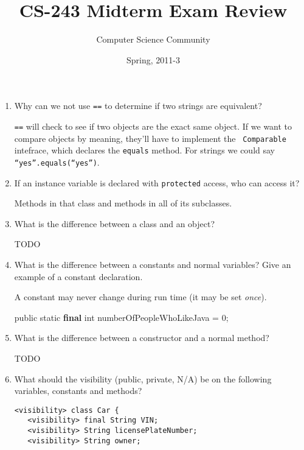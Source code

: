 \documentclass[11pt]{article}
\author{Computer Science Community}
\title{CS-243 Midterm Exam Review}
\date{Spring, 2011-3}
\makeatletter
\newenvironment{answer}{\large\lstset{basicstyle=\large}\color{white}}{}
\newenvironment{answer}{\large\lstset{basicstyle=\large}\color{red}}{}
\let\thetitle\@title
\let\thedate\@date
\makeatother
\begin{document}
\noindent{\Large \thetitle \hfill \thedate}

\begin{enumerate}

\item Why can we not use {\tt ==} to determine if two strings are equivalent?

    \begin{answer}
    {\tt ==} will check to see if two objects are the exact same object. If we
    want to compare objects by meaning, they'll have to implement the {\tt
    Comparable} intefrace, which declares the {\tt equals} method. For strings
    we could say {\tt ``yes''.equals(``yes'')}.
    \end{answer}

\item If an instance variable is declared with {\tt protected} access, who can
      access it?

    \begin{answer}
    Methods in that class and methods in all of its subclasses.
    \end{answer}

\item What is the difference between a class and an object?

    \begin{answer}
    \huge TODO
    \end{answer}

\item What is the difference between a constants and normal variables? Give an
      example of a constant declaration.

    \begin{answer}
    A constant may never change during run time (it may be set {\em once}).

    public static {\bf final} int numberOfPeopleWhoLikeJava = 0;
    \end{answer}

\item What is the difference between a constructor and a normal method?

    \begin{answer}
    \huge TODO
    \end{answer}

\item What should the visibility (public, private, N/A) be on the following
      variables, constants and methods?\label{car-visibility}

\begin{lstlisting}
<visibility> class Car {
   <visibility> final String VIN;
   <visibility> String licensePlateNumber;  
   <visibility> String owner;


\end{lstlisting}
\end{enumerate}
\end{document}
